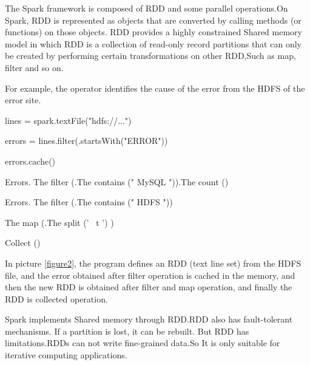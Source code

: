 \documentclass[journal]{IEEEtran}
\begin{document}
The Spark framework is composed of RDD\cite{RDD} and some parallel operations.On Spark, RDD is represented as objects that are converted by calling methods (or functions) on those objects. RDD provides a highly constrained Shared memory model in which RDD is a collection of read-only record partitions that can only be created by performing certain transformations on other RDD,Such as map, filter and so on.

For example, the operator identifies the cause of the error from  the HDFS of the error site.

lines = spark.textFile("hdfs://...")

errors = lines.filter(.startsWith("ERROR"))

errors.cache()

Errors. The filter (.The contains (" MySQL ")).The count ()

Errors. The filter (.The contains (" HDFS "))

The map (.The split (' \  t ') )

Collect ()

In picture \ref{figure2}, the program defines an RDD (text line set) from the HDFS file, and the error obtained after filter operation is cached in the memory, and then the new RDD is obtained after filter and map operation, and finally the RDD is collected operation.			

Spark implements Shared memory through RDD.RDD also has fault-tolerant mechanisms. If a partition is lost, it can be rebuilt. But RDD has limitations.RDDs can not write fine-grained data.So It is only suitable for iterative computing applications.
\end{document}
